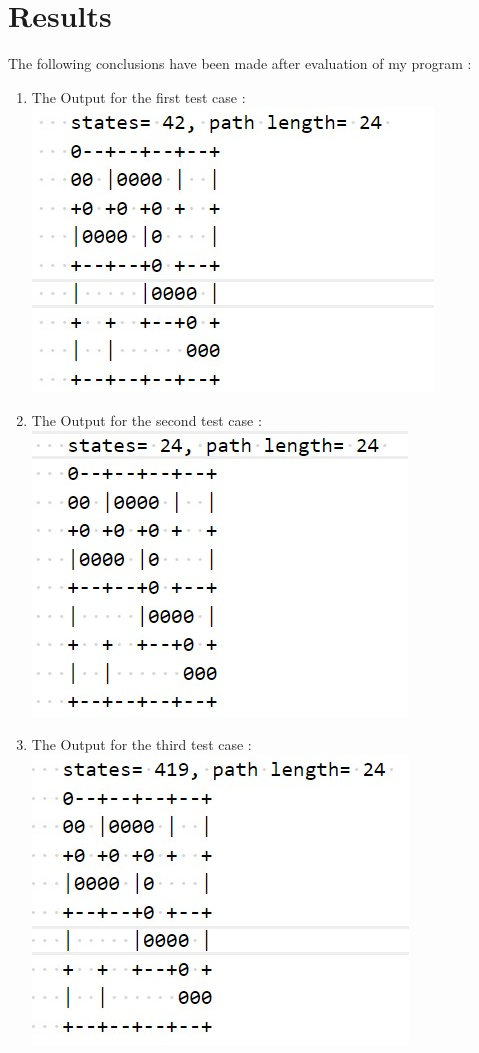 \documentclass{article}
\begin{document}
\section{Results}
\vspace{20pt}
The following conclusions have been made after evaluation of my program : 
\begin{enumerate}
    \item The Output for the first test case :
    \\\includegraphics{Output1.jpg}
    \item The Output for the second test case :
    \\\includegraphics{Output2.jpg}
\newpage
    \item The Output for the third test case :
    \\\includegraphics{Output3.jpg}

\end{enumerate}
\end{document}
